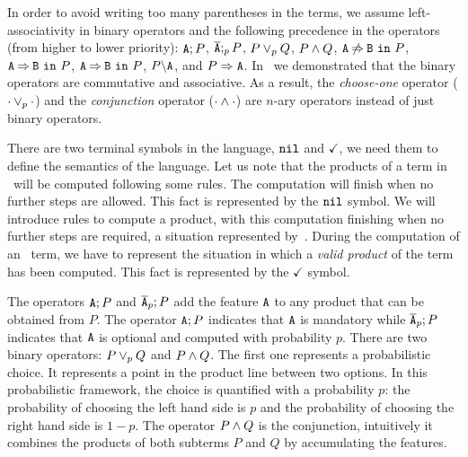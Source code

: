 In order to avoid writing too many parentheses in the terms, we
assume left-associativity in binary operators and  the
following precedence in the operators (from higher to lower priority):
$\feature{A};P$, $\ofeature{A};_{p} P$, $ P \choice_{p} Q$, $P\paral Q$,
$\exclude{A}{B}{P}$, $\require{A}{B}{P}$,
$\require{A}{B}{P}$,  $\forbid{A}{P}$, and $\mandatory{A}{P}$.
In~\cite{acl13,clc16} we demonstrated that
the binary
operators are commutative and associative.
As a result, the
\emph{choose-one} operator ($\cdot\choice_{p}\cdot$) and the
\emph{conjunction} operator ($\cdot\paral\cdot$) are $n$-ary operators
instead of just binary operators.



There are two terminal symbols in
the language, $\nil$ and $\checkmark$,
we need them to define the semantics of the language.
Let us note that the products of a term in \fodaPA\ will be computed following some rules.
The computation will finish when no further steps are allowed.
This fact is represented by the $\nil$ symbol.
We will introduce rules to compute a product, with this computation
finishing when no further steps are required, a situation represented by~\nil.
During the computation of an \fodaPAp\ term,  we have
to represent the situation in which a \emph{valid product}
of the term has been computed.
This fact is represented by the $\checkmark$ symbol.

The operators $\feature{A};P$ and $\ofeature{A}_{p};P$ add the feature $\feature{A}$ to any product that can be obtained
from $P$. The operator $\feature{A};P$ indicates that $\feature{A}$ is mandatory while $\ofeature{A}_{p};P$ indicates
that $\feature{A}$ is optional and computed with probability $p$.
There are two binary operators: $P \choice_{p} Q$ and $P\paral Q$. The
first one represents a probabilistic choice. It represents a point in
the product line between two options. In this probabilistic framework,
the choice is quantified with a probability \(p\): the probability of
choosing the left hand side is \(p\) and the probability of choosing
the right hand side is \(1-p\). The operator $P\paral Q$ is the
conjunction, intuitively it combines the products of both subterms
\(P\) and \(Q\) by accumulating the features.

